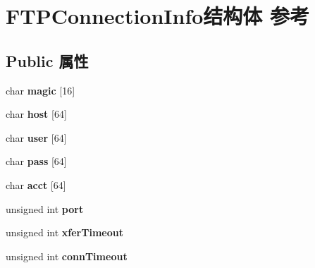 \hypertarget{struct_f_t_p_connection_info}{}\section{F\+T\+P\+Connection\+Info结构体 参考}
\label{struct_f_t_p_connection_info}
\subsection*{Public 属性}
\begin{DoxyCompactItemize}
\item 
\mbox{\label{struct_f_t_p_connection_info_a3ee223b128b16e8eb6bd621af6960990}} 
char {\bfseries magic} \mbox{[}16\mbox{]}
\item 
\mbox{\label{struct_f_t_p_connection_info_a3b1f874d4397481ba45de719ac3f9847}} 
char {\bfseries host} \mbox{[}64\mbox{]}
\item 
\mbox{\label{struct_f_t_p_connection_info_afd8f68caf110965402aee2767e8c20d3}} 
char {\bfseries user} \mbox{[}64\mbox{]}
\item 
\mbox{\label{struct_f_t_p_connection_info_acf0b7b0d0fd9d5c1b895d83a4c686174}} 
char {\bfseries pass} \mbox{[}64\mbox{]}
\item 
\mbox{\label{struct_f_t_p_connection_info_aebab5867ff6f44b6af7373674e3e8762}} 
char {\bfseries acct} \mbox{[}64\mbox{]}
\item 
\mbox{\label{struct_f_t_p_connection_info_ac9f9b2d74930fa2aa92ab04c9b85d1da}} 
unsigned int {\bfseries port}
\item 
\mbox{\label{struct_f_t_p_connection_info_a45ecae553d4d74f0233910fa880d348a}} 
unsigned int {\bfseries xfer\+Timeout}
\item 
\mbox{\label{struct_f_t_p_connection_info_a567e9698870c63875aae55c959964ff1}} 
unsigned int {\bfseries conn\+Timeout}
\item 
\mbox{\label{struct_f_t_p_connection_info_ae7ed36415bbc9a35636b4fb50df91233}} 

\end{DoxyCompactItemize}
